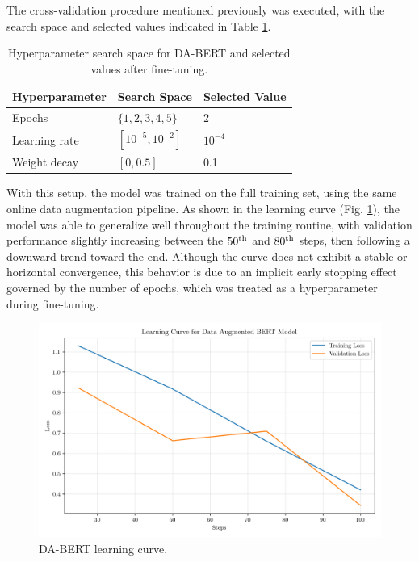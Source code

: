 \documentclass[conference]{IEEEtran}
\begin{document}
The cross-validation procedure mentioned previously was executed, with the search space and selected values indicated in Table \ref{parameters_basebert}.

\begin{table}[H]
\centering
\caption{Hyperparameter search space for DA-BERT and selected values after fine-tuning.}
\label{parameters_basebert}
\begin{tabular}{lll}
\toprule
\textbf{Hyperparameter} & \textbf{Search Space} & \textbf{Selected Value} \\
\midrule
Epochs & $\{1,2,3,4,5\}$ & 2 \\
Learning rate & $[10^{-5}, 10^{-2}]$ & $10^{-4}$ \\
Weight decay & $[0, 0.5]$ & 0.1 \\
\bottomrule
\end{tabular}
\end{table}


With this setup, the model was trained on the full training set, using the same online data augmentation pipeline. As shown in the learning curve (Fig. \ref{fig:data_augmented_bert_learninc_curve}), the model was able to generalize well throughout the training routine, with validation performance slightly increasing between the $50^{\textnormal{th}}$ and $80^{\textnormal{th}}$ steps, then following a downward trend toward the end. Although the curve does not exhibit a stable or horizontal convergence, this behavior is due to an implicit early stopping effect governed by the number of epochs, which was treated as a hyperparameter during fine-tuning.

\begin{figure}[H]
    \centering
    \includegraphics[width=1\linewidth]{assets/data_augmented_bert_learninc_curve.png}
    \caption{DA-BERT learning curve.}
    \label{fig:data_augmented_bert_learninc_curve}
\end{figure}
\end{document}
